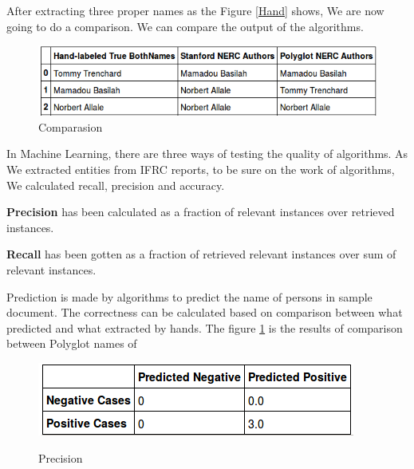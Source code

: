 After extracting three proper names as the Figure \ref{Hand} shows,  We are now going to do a comparison. We can compare the output of the algorithms.

\begin{figure}[hbtp]
\caption{Comparasion}
\centering
\includegraphics[scale=.8]{images/comparason.png}
\end{figure}


In Machine Learning, there are three ways of testing the quality of algorithms. As We extracted  entities from IFRC reports, to be sure on the work of algorithms,  We calculated recall, precision and accuracy. 

\textbf{Precision} has been calculated as a  fraction of relevant instances over  retrieved instances.

\textbf{Recall} has been gotten as a fraction of retrieved relevant instances over  sum of relevant instances.



Prediction is made by algorithms to predict the name of persons in sample document. The correctness can be calculated based on comparison between what predicted and what extracted by hands. The figure \ref{prediction} is  the results of comparison between Polyglot names of 
\begin{figure}[hbtp]
\caption{Precision}
\centering
\includegraphics[scale=1]{images/precision.png}\label{prediction}
\end{figure}

